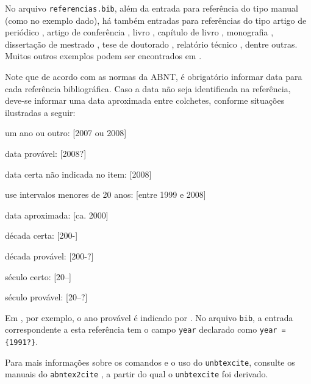 No arquivo \texttt{referencias.bib}, além da entrada para referência do tipo manual (como no exemplo dado), há também entradas para referências do tipo artigo de periódico \cite{greenwade1993}, artigo de conferência \cite{martin1997}, livro \cite{schaum1956}, capítulo de livro \cite{bates2010}, monografia \cite{morgado1990}, dissertação de mestrado \cite{macedo2005}, tese de doutorado \cite{guizzardi2005}, relatório técnico \cite{KBBDR2020}, dentre outras. Muitos outros exemplos podem ser encontrados em \cite{abntex2cite}.

Note que de acordo com as normas da ABNT, é obrigatório informar data para cada referência bibliográfica. Caso a data não seja identificada na referência, deve-se informar uma data aproximada entre colchetes, conforme situações ilustradas a seguir:

\begin{alineas}
    \item um ano ou outro: [2007 ou 2008]
    \item data provável: [2008?]
    \item data certa não indicada no item: [2008]
    \item use intervalos menores de 20 anos: [entre 1999 e 2008]
    \item data aproximada: [ca. 2000]
    \item década certa: [200-]
    \item década provável: [200-?]
    \item século certo: [20--]
    \item século provável: [20--?]
\end{alineas}

Em , por exemplo, o ano provável é indicado por \citeyear{marins1991}. No arquivo \texttt{bib}, a entrada correspondente a esta referência tem o campo \texttt{year} declarado como \verb|year = {1991?}|.

Para mais informações sobre os comandos e o uso do \texttt{unbtexcite}, consulte os manuais do \texttt{abntex2cite} \cite{abntex2cite,abntex2cite-alf}, a partir do qual o \texttt{unbtexcite} foi derivado.